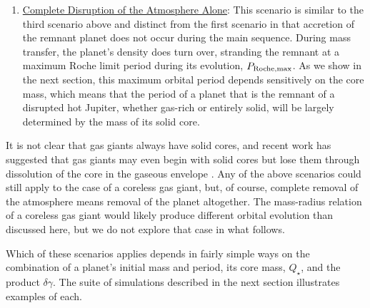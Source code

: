 \documentclass{svjour3}                     %
\begin{document}
\begin{enumerate}
\item \underline{Complete Disruption of the Atmosphere Alone}: This scenario is similar to the third scenario above and distinct from the first scenario in that accretion of the remnant planet does not occur during the main sequence. During mass transfer, the planet's density does turn over, stranding the remnant at a maximum Roche limit period during its evolution, $P_{\rm Roche, max}$. As we show in the next section, this maximum orbital period depends sensitively on the core mass, which means that the period of a planet that is the remnant of a disrupted hot Jupiter, whether gas-rich or entirely solid, will be largely determined by the mass of its solid core. 

\end{enumerate}

It is not clear that gas giants always have solid cores, and recent work has suggested that gas giants may even begin with solid cores but lose them through dissolution of the core in the gaseous envelope \cite{2012ApJ...745...54W}. Any of the above scenarios could still apply to the case of a coreless gas giant, but, of course, complete removal of the atmosphere means removal of the planet altogether. The mass-radius relation of a coreless gas giant would likely produce different orbital evolution than discussed here, but we do not explore that case in what follows. 

Which of these scenarios applies depends in fairly simple ways on the combination of a planet's initial mass and period, its core mass, $Q_\star$, and the product $\delta \gamma$. The suite of simulations described in the next section illustrates examples of each.
\end{document}
